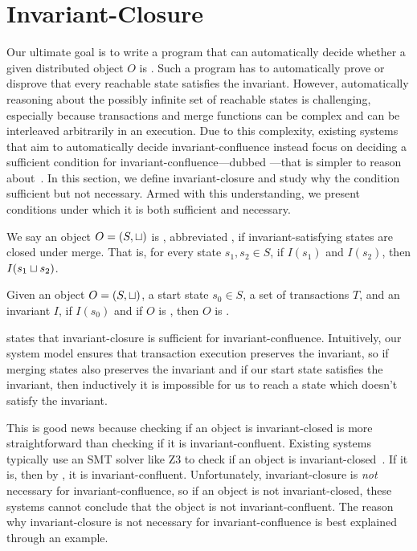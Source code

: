 \section{Invariant-Closure}
Our ultimate goal is to write a program that can automatically decide whether a
given distributed object $O$ is \sTIconfluent{}. Such a program has to
automatically prove or disprove that every reachable state satisfies the
invariant. However, automatically reasoning about the possibly infinite set of
reachable states is challenging, especially because transactions and merge
functions can be complex and can be interleaved arbitrarily in an execution.
Due to this complexity, existing systems that aim to automatically decide
invariant-confluence instead focus on deciding a sufficient condition for
invariant-confluence---dubbed ---that is simpler to
reason about~\cite{li2012making, li2014automating}. In this section, we define
invariant-closure and study why the condition sufficient but not necessary.
Armed with this understanding, we present conditions under which it is both
sufficient and necessary.

We say an object $O = (S, \sqcup)$ is , abbreviated , if invariant-satisfying
states are closed under merge. That is, for every state $s_1, s_2 \in S$, if
$I(s_1)$ and $I(s_2)$, then $I(s_1 \sqcup s_2)$.

\begin{theorem}
  Given an object $O = (S, \sqcup)$, a start state $s_0 \in S$, a set of
  transactions $T$, and an invariant $I$, if $I(s_0)$ and if $O$ is \Iclosed{},
  then $O$ is \sTIconfluent{}.
\end{theorem}

 states that invariant-closure is
sufficient for invariant-confluence. Intuitively, our system model ensures that
transaction execution preserves the invariant, so if merging states also
preserves the invariant and if our start state satisfies the invariant, then
inductively it is impossible for us to reach a state which doesn't satisfy the
invariant.

This is good news because checking if an object is invariant-closed is more
straightforward than checking if it is invariant-confluent. Existing systems
typically use an SMT solver like Z3 to check if an object is
invariant-closed~\cite{de2008z3, balegas2015putting, gotsman2016cause}. If it
is, then by , it is invariant-confluent.
Unfortunately, invariant-closure is \emph{not} necessary for
invariant-confluence, so if an object is not invariant-closed, these systems
cannot conclude that the object is not invariant-confluent. The reason why
invariant-closure is not necessary for invariant-confluence is best explained
through an example.

